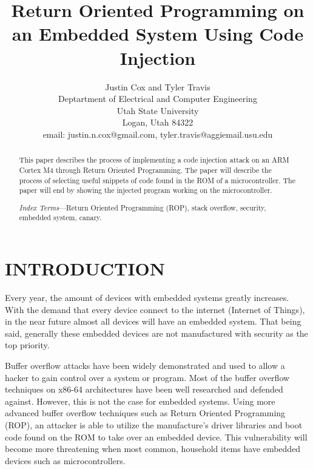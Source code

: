 \documentclass[letterpaper, 10 pt, conference]{ieeeconf}  %
\title{\LARGE \bf
Return Oriented Programming on an Embedded System Using Code Injection
}
\author{Justin Cox and Tyler Travis
\\ \small{Deptartment of Electrical and Computer Engineering}
\\ \small{Utah State University}
\\ \small{Logan, Utah 84322}
\\ \small{email: justin.n.cox@gmail.com, tyler.travis@aggiemail.usu.edu}
}
\begin{document}
\maketitle
\thispagestyle{empty}
\pagestyle{empty}


\begin{abstract}

This paper describes the process of implementing a code injection attack on an ARM Cortex M4 through Return Oriented Programming.  The paper will describe the process of selecting useful snippets of code found in the ROM of a microcontroller.  The paper will end by showing the injected program working on the microcontroller.  

\emph{Index Terms}---Return Oriented Programming (ROP), stack overflow, security, embedded system, canary.    

\end{abstract}

\section{INTRODUCTION}

Every year, the amount of devices with embedded systems greatly increases.  With the demand that every device connect to the internet (Internet of Things), in the near future almost all devices will have an embedded system.  That being said, generally these embedded devices are not manufactured with security as the top priority.

Buffer overflow attacks have been widely demonstrated and used to allow a hacker to gain control over a system or program.  Most of the buffer overflow techniques on x86-64 architectures have been well researched and defended against.  However, this is not the case for embedded systems.  Using more advanced buffer overflow techniques such as Return Oriented Programming (ROP), an attacker is able to utilize the manufacture's driver libraries and boot code found on the ROM to take over an embedded device.  This vulnerability will become more threatening when most common, household items have embedded devices such as microcontrollers.       

 
\end{document}
